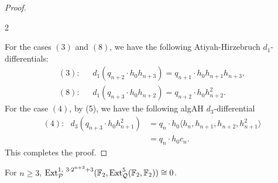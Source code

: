 \begin{proof}
\begin{multicols}{2}
\begin{enumerate}
\end{enumerate}
\end{multicols}
For the cases $(3)$ and $(8)$, we have the following Atiyah-Hirzebruch $d_1$-differentials:
 \begin{align*}
(3): \ \ \ & d_1(q_{n+2} \cdot h_0h_{n+3})  = q_{n+1} \cdot h_0h_{n+1}h_{n+3}, \\
(8): \ \ \ & d_1(q_{n+3} \cdot h_0h_{n+2})  = q_{n+2} \cdot h_0h_{n+2}^2.
\end{align*}
For the case $(4)$, by (5), we have the following algAH $d_3$-differential
\begin{align*}
(4): \ \ \ d_3(q_{n+3} \cdot h_0h_{n+1}^2) & = q_{n} \cdot h_0 \langle h_n, h_{n+1}, h_{n+2}, h_{n+1}^2 \rangle \\
& = q_n \cdot h_0c_n.
\end{align*}
This completes the proof.
\end{proof}

\begin{lem}  \label{lem:skt153}
For $n\geq 3$,  $\operatorname{\mathrm{Ext}}^{1,\ 3\cdot 2^{n+3} + 3}_{\mathcal{P}}(\operatorname{\mathbb{F}}_2, \operatorname{\mathrm{Ext}}_{\mathcal{Q}}^5(\operatorname{\mathbb{F}}_2, \operatorname{\mathbb{F}}_2)) \cong 0$.
\end{lem}


